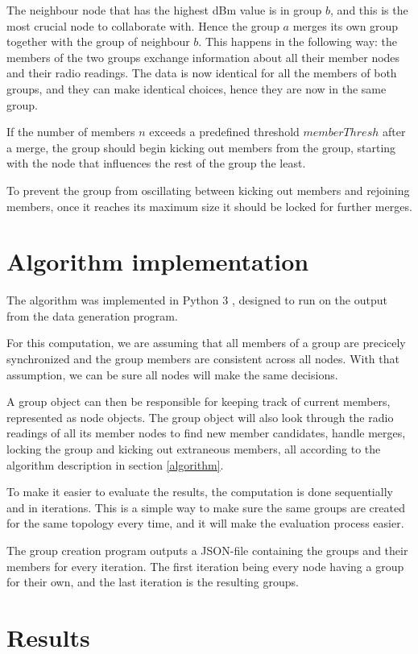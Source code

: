 The neighbour node that has the highest dBm value is in group $b$, and this is the most crucial node to collaborate with. Hence the group $a$ merges its own group together
with the group of neighbour $b$. This happens in the following way: the members of the two groups exchange information about all their member nodes and their radio readings.
The data is now identical for all the members of both groups, and they can make identical choices, hence they are now in the same group. 

If the number of members $n$ exceeds a predefined threshold $memberThresh$ after a merge, the group should begin kicking out members from the group, starting with the node
that influences the rest of the group the least. 

To prevent the group from oscillating between kicking out members and rejoining members, once it reaches
its maximum size it should be locked for further merges. 

\section{Algorithm implementation}
The algorithm was implemented in Python 3 \cite{Python3}, designed to run on the output from 
the data generation program.

For this computation, we are assuming that all members of a group are precicely synchronized
and the group members are consistent across all nodes. With that assumption, we can be sure
all nodes will make the same decisions. 

A group object can then be responsible for keeping track of current members,
represented as node objects. The group object will also look through the radio readings
of all its member nodes to find new member candidates, handle merges, locking the group and
kicking out extraneous members, all according to the algorithm description in section
\ref{algorithm}.


To make it easier to evaluate the results, the computation is done sequentially
and in iterations. This is a simple way to make sure the same groups are created 
for the same topology every time, and it will make the evaluation process easier. 

The group creation program outputs a JSON-file containing the groups and their members for every iteration. The first iteration being every node having a group for their own,
and the last iteration is the resulting groups.
\section{Results}

